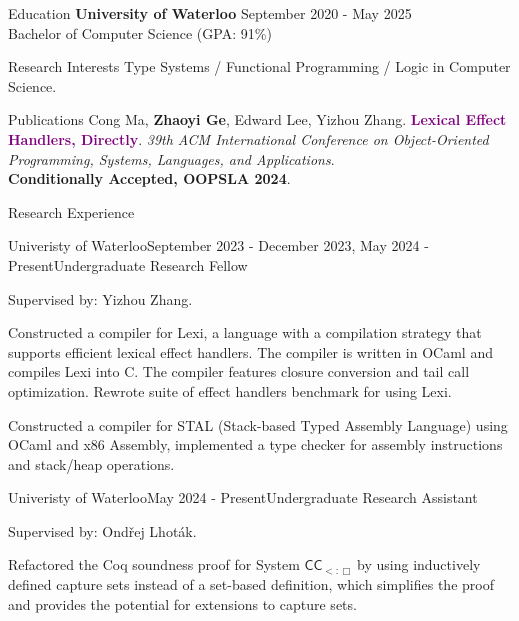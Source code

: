 \documentclass[
	12pt, %
]{resume} %
\newcommand\CC{$\textsf{CC}_{<:\Box}~$}
\begin{document}

\begin{rSection}{Education}
	\textbf{University of Waterloo} \hfill {September 2020 - May 2025} \\ 
	Bachelor of Computer Science (GPA: 91\%)
\end{rSection}

\begin{rSection}{Research Interests}
	Type Systems / Functional Programming / Logic in Computer Science.
\end{rSection}

\begin{rSection}{Publications}
	{Cong Ma, \textbf{Zhaoyi Ge}, Edward Lee, Yizhou Zhang}. \textcolor{purple}{\textbf{Lexical Effect Handlers, Directly}}.
	\textit{39th ACM International Conference on Object-Oriented Programming, Systems, Languages, and Applications}.
	\\
	\textbf{Conditionally Accepted, OOPSLA 2024}.
\end{rSection}

\begin{rSection}{Research Experience}
	\begin{rSubsection}{Univeristy of Waterloo}{September 2023 - December 2023, May 2024 - Present}{Undergraduate Research Fellow}{}
		\item Supervised by: Yizhou Zhang.
		\item Constructed a compiler for Lexi, a language with a compilation strategy that supports
		efficient lexical effect handlers. The compiler is written in OCaml and compiles Lexi into C.
		The compiler features closure conversion and tail call optimization. 
		Rewrote suite of effect handlers benchmark for using Lexi.
		\item Constructed a compiler for STAL (Stack-based Typed Assembly Language) using OCaml and x86 Assembly,
		implemented a type checker for assembly instructions and stack/heap operations. 
	\end{rSubsection}
	\begin{rSubsection}{Univeristy of Waterloo}{May 2024 - Present}{Undergraduate Research Assistant}{}
		\item Supervised by: Ondřej Lhoták.
		\item Refactored the Coq soundness proof for System \CC by using inductively defined capture sets 
		instead of a set-based definition, which simplifies the proof 
		and provides the potential for extensions to capture sets.
	\end{rSubsection}
\end{rSection}
\end{document}
